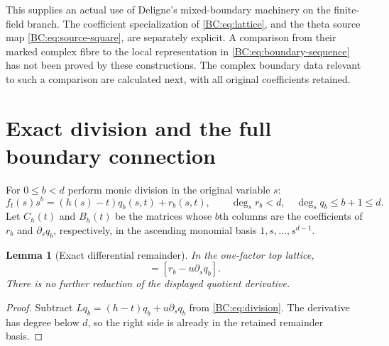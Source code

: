 \documentclass[11pt,a4paper]{article}
\newtheorem{lemma}[theorem]{Lemma}
\begin{document}
This supplies an actual use of Deligne's mixed-boundary machinery on
the finite-field branch.  The coefficient specialization of
\eqref{BC:eq:lattice}, and the theta source map
\eqref{BC:eq:source-square}, are separately explicit.  A comparison from
their marked complex fibre to the local representation in
\eqref{BC:eq:boundary-sequence} has not been proved by these constructions.
The complex boundary data relevant to such a comparison are calculated
next, with all original coefficients retained.

\section{Exact division and the full boundary connection}

For $0\le b<d$ perform monic division in the original variable $s$:
\begin{equation}
 f_t(s)s^b=(h(s)-t)q_b(s,t)+r_b(s,t),\qquad
 \deg_s r_b<d,\quad \deg_s q_b\le b+1\le d.
 \label{BC:eq:division}
\end{equation}
Let $C_h(t)$ and $B_h(t)$ be the matrices whose $b$th columns are the
coefficients of $r_b$ and $\partial_s q_b$, respectively, in the
ascending monomial basis $1,s,\ldots,s^{d-1}$.

\begin{lemma}[Exact differential remainder]
In the one-factor top lattice,
\begin{equation}
 [f_t s^b]=[r_b-u\partial_s q_b].
 \label{BC:eq:reduction}
\end{equation}
There is no further reduction of the displayed quotient derivative.
\end{lemma}
\begin{proof}
Subtract $Lq_b=(h-t)q_b+u\partial_s q_b$ from
\eqref{BC:eq:division}.  The derivative has degree below $d$, so the
right side is already in the retained remainder basis.
\end{proof}
\end{document}
